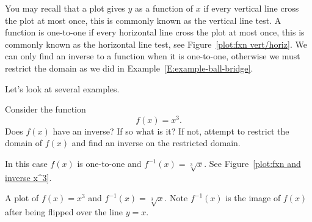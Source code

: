 You may recall that a plot gives $y$ as a function of $x$ if every
vertical line cross the plot at most once, this is commonly known as
the vertical line test. A function is one-to-one if every horizontal
line cross the plot at most once, this is commonly known as the
horizontal line test, see Figure~\ref{plot:fxn vert/horiz}.  We can
only find an inverse to a function when it is one-to-one, otherwise we
must restrict the domain as we did in
Example~\ref{E:example-ball-bridge}.


Let's look at several examples.



\begin{example}
Consider the function
\[
f(x) = x^3.
\]
Does $f(x)$ have an inverse? If so what is it? If not, attempt to
restrict the domain of $f(x)$ and find an inverse on the restricted
domain.
\end{example}


\begin{solution}
In this case $f(x)$ is one-to-one and $f^{-1}(x) = \sqrt[3]{x}$. See Figure~\ref{plot:fxn and inverse x^3}.
\end{solution}

\begin{marginfigure}[-2in]
\caption{A plot of $f(x)=x^3$ and $f^{-1}(x) = \sqrt[3]{x}$. Note
  $f^{-1}(x)$ is the image of $f(x)$ after being flipped over the line
  $y=x$.}
\label{plot:fxn and inverse x^3}
\end{marginfigure}


